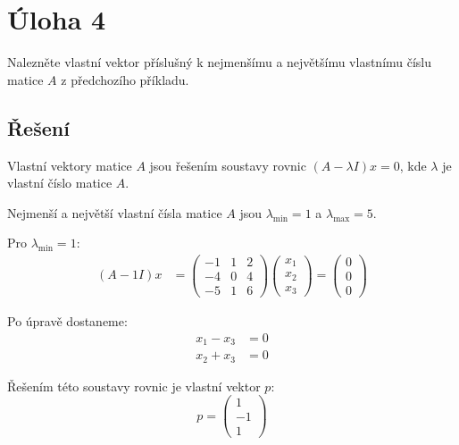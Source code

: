 \documentclass[10pt, a4paper]{ReportSheet}
\newcommand{\uloha}[4]{
    \section{Úloha #1\hfill\small\normalfont{(#2 body)}}
    \label{sec:uloha-#1}
    #3
    \subsection{Řešení}
    \label{subsec:uloha-#1-reseni}
    #4
    \newpage
}
\begin{document}
    \uloha{4}{3}{
        Nalezněte vlastní vektor příslušný k nejmenšímu a největšímu vlastnímu číslu matice $A$ z předchozího příkladu.
    }{
        Vlastní vektory matice $A$ jsou řešením soustavy rovnic $(A - \lambda I)x = 0$, kde $\lambda$ je vlastní číslo matice $A$.

        Nejmenší a největší vlastní čísla matice $A$ jsou $\lambda_{\min} = 1$ a $\lambda_{\max} = 5$.

        Pro $\lambda_{\min} = 1$:
        \begin{equation*}
            \begin{aligned}
                (A - 1I)x &= \begin{pmatrix}
                                 -1 & 1 & 2 \\
                                 -4 & 0 & 4 \\
                                 -5 & 1 & 6
                \end{pmatrix} \begin{pmatrix}
                                 x_1 \\
                                 x_2 \\
                                 x_3
                \end{pmatrix} = \begin{pmatrix}
                                   0 \\
                                   0 \\
                                   0
                \end{pmatrix}
            \end{aligned}
        \end{equation*}

        Po úpravě dostaneme:
        \begin{equation*}
            \begin{aligned}
                x_1 - x_3 &= 0 \\
                x_2 + x_3 &= 0
            \end{aligned}
        \end{equation*}

        Řešením této soustavy rovnic je vlastní vektor $p$:
        \begin{equation*}
            p = \begin{pmatrix}
                    1 \\
                    -1 \\
                    1
            \end{pmatrix}
        \end{equation*}

}
\end{document}
